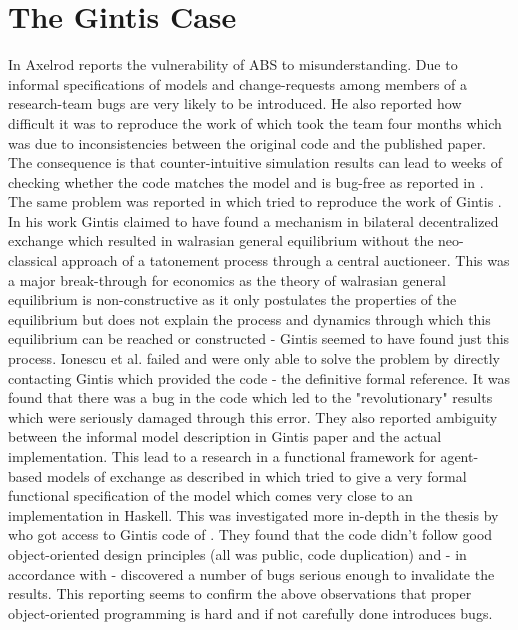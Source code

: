 \section{The Gintis Case}
In \cite{axelrod_chapter_2006} Axelrod reports the vulnerability of ABS to misunderstanding. Due to informal specifications of models and change-requests among members of a research-team bugs are very likely to be introduced. He also reported how difficult it was to reproduce the work of \cite{axelrod_convergence_1995} which took the team four months which was due to inconsistencies between the original code and the published paper. The consequence is that counter-intuitive simulation results can lead to weeks of checking whether the code matches the model and is bug-free as reported in \cite{axelrod_advancing_1997}.
The same problem was reported in \cite{ionescu_dependently-typed_2012} which tried to reproduce the work of Gintis \cite{gintis_emergence_2006}. In his work Gintis claimed to have found a mechanism in bilateral decentralized exchange which resulted in walrasian general equilibrium without the neo-classical approach of a tatonement process through a central auctioneer. This was a major break-through for economics as the theory of walrasian general equilibrium is non-constructive as it only postulates the properties of the equilibrium \cite{colell_microeconomic_1995} but does not explain the process and dynamics through which this equilibrium can be reached or constructed - Gintis seemed to have found just this process. Ionescu et al. \cite{ionescu_dependently-typed_2012} failed and were only able to solve the problem by directly contacting Gintis which provided the code - the definitive formal reference. It was found that there was a bug in the code which led to the "revolutionary" results which were seriously damaged through this error. They also reported ambiguity between the informal model description in Gintis paper and the actual implementation.
This lead to a research in a functional framework for agent-based models of exchange as described in \cite{botta_functional_2011} which tried to give a very formal functional specification of the model which comes very close to an implementation in Haskell.
This was investigated more in-depth in the thesis by \cite{evensen_extensible_2010} who got access to Gintis code of \cite{gintis_emergence_2006}. They found that the code didn't follow good object-oriented design principles (all was public, code duplication) and - in accordance with \cite{ionescu_dependently-typed_2012} - discovered a number of bugs serious enough to invalidate the results. This reporting seems to confirm the above observations that proper object-oriented programming is hard and if not carefully done introduces bugs.
